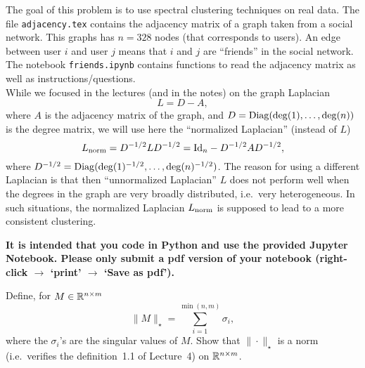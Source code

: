 \documentclass[11pt,nocut]{article}
\begin{document}
\begin{problem}[4 points]
	The goal of this problem is to use spectral clustering techniques on real data.
	The file \texttt{adjacency.tex} contains the adjacency matrix of a graph taken from a social network. This graphs has $n=328$ nodes (that corresponds to users). An edge between user $i$ and user $j$ means that $i$ and $j$ are ``friends'' in the social network.
	The notebook \texttt{friends.ipynb} contains functions to read the adjacency matrix as well as instructions/questions.
	\\

	While we focused in the lectures (and in the notes) on the graph Laplacian
	$$
	L = D - A,
	$$
	where $A$ is the adjacency matrix of the graph, and $D = {{\rm Diag}}({\rm deg}(1), \dots, {\rm deg}(n))$ is the degree matrix, we will use here the ``normalized Laplacian'' (instead of $L$)
	$$
	L_{\rm norm} = D^{-1/2} L D^{-1/2} = {{\rm Id}}_n - D^{-1/2} A D^{-1/2},
	$$
	where $D^{-1/2} = {{\rm Diag}}({\rm deg}(1)^{-1/2}, \dots, {\rm deg}(n)^{-1/2})$. The reason for using a different Laplacian is that then ``unnormalized Laplacian'' $L$ does not perform well when the degrees in the graph are very broadly distributed, i.e.\ very heterogeneous. In such situations, the normalized Laplacian $L_{\rm norm}$ is supposed to lead to a more consistent clustering.

	\textbf{It is intended that you code in Python and use the provided Jupyter Notebook. Please only submit a pdf version of your notebook (right-click $\to$ `print' $\to$ `Save as pdf').}
\end{problem}


\vspace{1mm}




\begin{problem}[$\star$]
	Define, for $M \in \mathbb{R}^{n \times m}$
	$$
	\|M\|_{\star} = \sum_{i=1}^{\min(n,m)} \sigma_i,
	$$
	where the $\sigma_i$'s are the singular values of $M$. Show that $\| \cdot \|_{\star}$ is a norm (i.e.\ verifies the definition~1.1 of Lecture~4) on $\mathbb{R}^{n \times m}$.
\end{problem}
\vspace{1cm}
\centerline{}

%
%
\end{document}
